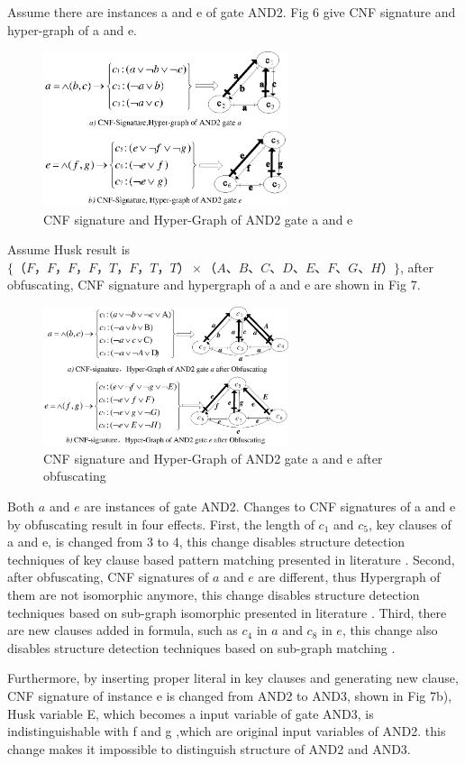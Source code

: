 \documentclass[runningheads,a4paper]{llncs}
\begin{document}
\setlength{\parindent}{2em} 
Assume there are instances a and e of gate AND2. Fig 6 give CNF signature and hyper-graph of a and e.
\begin{figure}
\centering
\includegraphics[width=7.2cm]{a6}
\caption{CNF signature and Hyper-Graph of AND2 gate a and e}
\end{figure}
Assume Husk result is $\{（F，F，F，F，T，F，T，T）\times（A、B、C、D、E、F、G、H）\}$, after obfuscating, CNF signature and hypergraph of a and e are shown in Fig 7.
\begin{figure}
\centering
\includegraphics[width=7.2cm]{a7}
\caption{CNF signature and Hyper-Graph of AND2 gate a and e after obfuscating}
\end{figure}
Both $a$ and $e$ are instances of gate AND2. Changes to CNF signatures of a and e by obfuscating result in four effects.
First, the length of $c_1$ and $c_5$, key clauses of a and e, is changed from 3 to 4, 
this change disables structure detection techniques of key clause based pattern matching presented in literature \cite{t9}.
Second, after obfuscating, CNF signatures of $a$ and $e$ are different, thus Hypergraph of them are not isomorphic anymore, 
this change disables structure detection techniques based on sub-graph isomorphic presented in literature \cite{t8}.
Third, there are new clauses added in formula, such as $c_4$ in $a$ and $c_8$ in $e$, 
this change also disables structure detection techniques based on sub-graph matching \cite{t8}. 

Furthermore, by inserting proper literal in key clauses and generating new clause, CNF signature of instance e is changed from AND2 to AND3, shown in Fig 7b),
Husk variable E, which becomes a input variable of gate AND3, is indistinguishable with f and g ,which are original input variables of AND2.
this change makes it impossible to distinguish structure of AND2 and AND3. 
\end{document}
